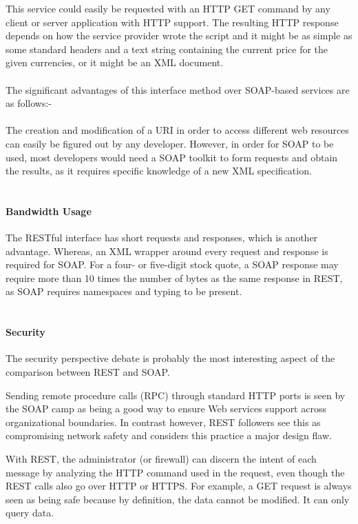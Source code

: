 This service could easily be requested with an HTTP GET command by any client or server application with HTTP support. The resulting HTTP response depends on how the service provider wrote the script and it might be as simple as some standard headers and a text string containing the current price for the given currencies, or it might be an XML document.
\\
\\
The significant advantages of this interface method over SOAP-based services are as follows:-
\\
\\
The creation and modification of a URI in order to access different web resources can easily be figured out by any developer. However, in order for SOAP to be used, most developers would need a SOAP toolkit to form requests and obtain the results, as it requires specific knowledge of a new XML specification.
\\
\\
\paragraph{Bandwidth Usage}

The RESTful interface has short requests and responses, which is another advantage. Whereas, an XML wrapper around every request and response is required for SOAP. For a four- or five-digit stock quote, a SOAP response may require more than 10 times the number of bytes as the same response in REST, as SOAP requires namespaces and typing to be present. 
\\
\\
\paragraph{Security}
The security perspective debate is probably the most interesting aspect of the comparison between REST and SOAP. 

Sending remote procedure calls (RPC) through standard HTTP ports is seen by the SOAP camp as being a good way to ensure Web services support across organizational boundaries. In contrast however, REST followers see this as compromising network safety and considers this practice a major design flaw.

With REST, the administrator (or firewall) can discern the intent of each message by analyzing the HTTP command used in the request, even though the REST calls also go over HTTP or HTTPS. For example, a GET request is always seen as being safe because by definition, the data cannot be modified. It can only query data.

